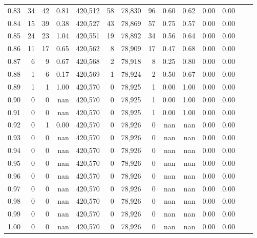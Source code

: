 \begin{tabular}{rrrrrrrrrrrrrr}
0.83 &      34 &     42 &    0.81 &  420,512 &       58 &  78,830 &      96 &  0.60 &  0.62 &  0.00 &      0.00 \\
0.84 &      15 &     39 &    0.38 &  420,527 &       43 &  78,869 &      57 &  0.75 &  0.57 &  0.00 &      0.00 \\
0.85 &      24 &     23 &    1.04 &  420,551 &       19 &  78,892 &      34 &  0.56 &  0.64 &  0.00 &      0.00 \\
0.86 &      11 &     17 &    0.65 &  420,562 &        8 &  78,909 &      17 &  0.47 &  0.68 &  0.00 &      0.00 \\
0.87 &       6 &      9 &    0.67 &  420,568 &        2 &  78,918 &       8 &  0.25 &  0.80 &  0.00 &      0.00 \\
0.88 &       1 &      6 &    0.17 &  420,569 &        1 &  78,924 &       2 &  0.50 &  0.67 &  0.00 &      0.00 \\
0.89 &       1 &      1 &    1.00 &  420,570 &        0 &  78,925 &       1 &  0.00 &  1.00 &  0.00 &      0.00 \\
0.90 &       0 &      0 &     nan &  420,570 &        0 &  78,925 &       1 &  0.00 &  1.00 &  0.00 &      0.00 \\
0.91 &       0 &      0 &     nan &  420,570 &        0 &  78,925 &       1 &  0.00 &  1.00 &  0.00 &      0.00 \\
0.92 &       0 &      1 &    0.00 &  420,570 &        0 &  78,926 &       0 &   nan &   nan &  0.00 &      0.00 \\
0.93 &       0 &      0 &     nan &  420,570 &        0 &  78,926 &       0 &   nan &   nan &  0.00 &      0.00 \\
0.94 &       0 &      0 &     nan &  420,570 &        0 &  78,926 &       0 &   nan &   nan &  0.00 &      0.00 \\
0.95 &       0 &      0 &     nan &  420,570 &        0 &  78,926 &       0 &   nan &   nan &  0.00 &      0.00 \\
0.96 &       0 &      0 &     nan &  420,570 &        0 &  78,926 &       0 &   nan &   nan &  0.00 &      0.00 \\
0.97 &       0 &      0 &     nan &  420,570 &        0 &  78,926 &       0 &   nan &   nan &  0.00 &      0.00 \\
0.98 &       0 &      0 &     nan &  420,570 &        0 &  78,926 &       0 &   nan &   nan &  0.00 &      0.00 \\
0.99 &       0 &      0 &     nan &  420,570 &        0 &  78,926 &       0 &   nan &   nan &  0.00 &      0.00 \\
1.00 &       0 &      0 &     nan &  420,570 &        0 &  78,926 &       0 &   nan &   nan &  0.00 &      0.00 \\
\bottomrule
\end{tabular}
